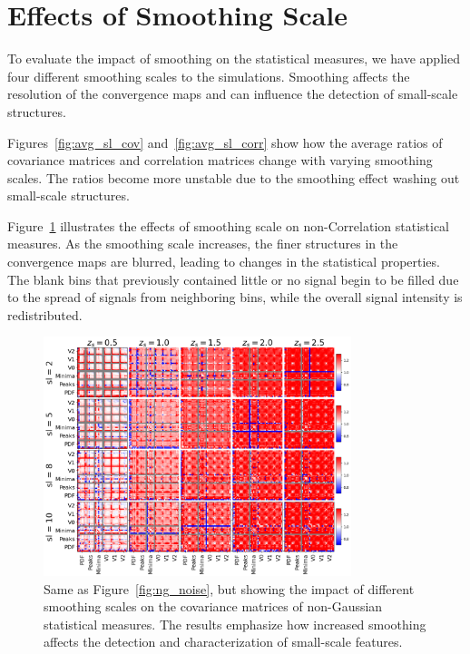 \section{Effects of Smoothing Scale}
To evaluate the impact of smoothing on the statistical measures, we have applied four different smoothing scales to the simulations. Smoothing affects the resolution of the convergence maps and can influence the detection of small-scale structures.

Figures~\ref{fig:avg_sl_cov} and~\ref{fig:avg_sl_corr} show how the average ratios of covariance matrices and correlation matrices change with varying smoothing scales. The ratios become more unstable due to the smoothing effect washing out small-scale structures.

Figure~\ref{fig:ng_smoothing} illustrates the effects of smoothing scale on non-Correlation statistical measures. As the smoothing scale increases, the finer structures in the convergence maps are blurred, leading to changes in the statistical properties. The blank bins that previously contained little or no signal begin to be filled due to the spread of signals from neighboring bins, while the overall signal intensity is redistributed.

\begin{figure}[ht]
    \centering
    \includegraphics[width=0.8\textwidth]{figures/results/nongaussian_cov_sl.png}
    \caption[BIGBOX/TILED Ratio of Covariance Matricies for multiple smoothing scales: Non-Gaussian Statistics]{Same as Figure~\ref{fig:ng_noise}, but showing the impact of different smoothing scales on the covariance matrices of non-Gaussian statistical measures. The results emphasize how increased smoothing affects the detection and characterization of small-scale features.}
    \label{fig:ng_smoothing}
\end{figure}

